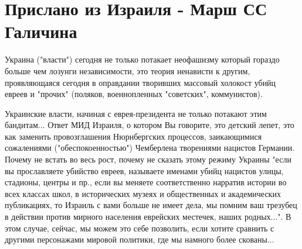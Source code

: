  
 
 
 
 
\section{Прислано из Израиля - Марш СС Галичина}
\label{sec:01_05_2021.fb.pogrebinskij_mihail.1.ss_galichina_izrail}

Украина ("власти") сегодня не только потакает неофашизму который гораздо больше
чем лозунги независимости, это теория ненависти к другим, проявляющаяся сегодня
в оправдании творивших массовый холокост убийц евреев и "прочих" (поляков,
военнопленных "советских", коммунистов).

Украинские власти, начиная с еврея-президента не только потакают этим
бандитам... Ответ МИД Израиля, о котором Вы говорите, это детский лепет, это
как заменить провозглашения Нюрнбергских процессов, заикающимися сожалениями
("обеспокоенностью") Чемберлена творениями нацистов Германии.  Почему не встать
во весь рост, почему не сказать этому режиму Украины "если вы прославляете
убийство евреев, называете именами убийц нацистов улицы, стадионы, центры и
пр., если вы меняете соответственно нарратив истории во всех классах школ, в
исторических музеях и общественных и академических публикациях, то Израиль с
вами больше не имеет дела, мы помним ваш трезубец в действии против мирного
населения еврейских местечек, наших родных...".  В этом случае, сейчас, мы
можем это себе позволить, если хотите сравнить с другими персонажами мировой
политики, где мы намного более скованы...

